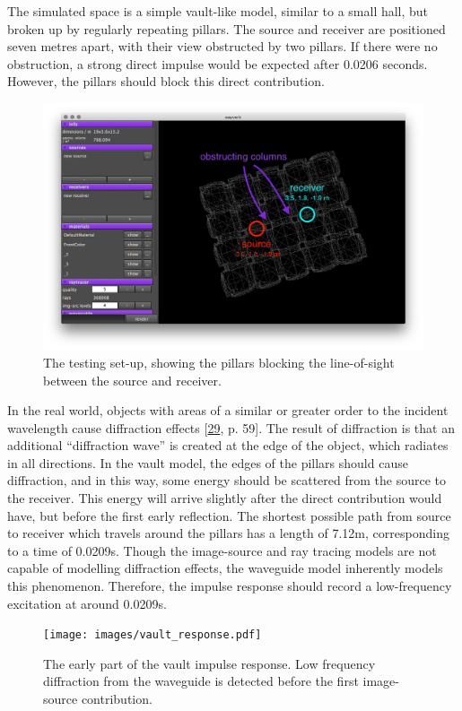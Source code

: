 \documentclass[]{scrreprt}
\begin{document}
The simulated space is a simple vault-like model, similar to a small
hall, but broken up by regularly repeating pillars. The source and
receiver are positioned seven metres apart, with their view obstructed
by two pillars. If there were no obstruction, a strong direct impulse
would be expected after 0.0206 seconds. However, the pillars should
block this direct contribution.

\begin{figure}[htbp]
\centering
\includegraphics{images/vault_demo.png}
\caption{The testing set-up, showing the pillars blocking the
line-of-sight between the source and receiver.}
\end{figure}

In the real world, objects with areas of a similar or greater order to
the incident wavelength cause diffraction effects
{[}\protect\hyperlink{ref-kuttruffux5froomux5f2009}{29}, p. 59{]}. The
result of diffraction is that an additional ``diffraction wave'' is
created at the edge of the object, which radiates in all directions. In
the vault model, the edges of the pillars should cause diffraction, and
in this way, some energy should be scattered from the source to the
receiver. This energy will arrive slightly after the direct contribution
would have, but before the first early reflection. The shortest possible
path from source to receiver which travels around the pillars has a
length of 7.12m, corresponding to a time of 0.0209s. Though the
image-source and ray tracing models are not capable of modelling
diffraction effects, the waveguide model inherently models this
phenomenon. Therefore, the impulse response should record a
low-frequency excitation at around 0.0209s.

\begin{figure}[htbp]
\centering
\texttt{[image: images/vault\_response.pdf]}
\caption{The early part of the vault impulse response. Low frequency
diffraction from the waveguide is detected before the first image-source
contribution.\label{fig:vault_response}}
\end{figure}
\end{document}
